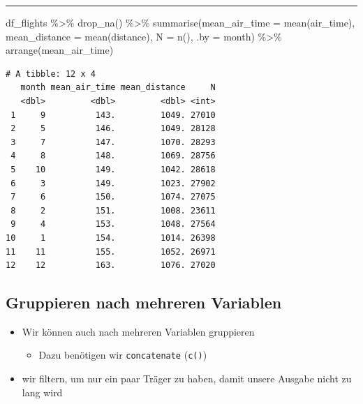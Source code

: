 \documentclass[
  letterpaper,
  DIV=11]{scrartcl}
\newenvironment{Shaded}{\begin{snugshade}}{\end{snugshade}}
\newcommand{\AttributeTok}[1]{\textcolor[rgb]{0.40,0.45,0.13}{#1}}
\newcommand{\FunctionTok}[1]{\textcolor[rgb]{0.28,0.35,0.67}{#1}}
\newcommand{\NormalTok}[1]{\textcolor[rgb]{0.00,0.23,0.31}{#1}}
\newcommand{\SpecialCharTok}[1]{\textcolor[rgb]{0.37,0.37,0.37}{#1}}
\providecommand{\tightlist}{%
  \setlength{\itemsep}{0pt}\setlength{\parskip}{0pt}}\usepackage{longtable,booktabs,array}
\begin{document}
\begin{center}\rule{0.5\linewidth}{0.5pt}\end{center}

\begin{Shaded}
\begin{Highlighting}[]
\NormalTok{df\_flights }\SpecialCharTok{\%\textgreater{}\%} 
  \FunctionTok{drop\_na}\NormalTok{() }\SpecialCharTok{\%\textgreater{}\%} 
  \FunctionTok{summarise}\NormalTok{(}\AttributeTok{mean\_air\_time =} \FunctionTok{mean}\NormalTok{(air\_time),}
            \AttributeTok{mean\_distance =} \FunctionTok{mean}\NormalTok{(distance),}
            \AttributeTok{N =} \FunctionTok{n}\NormalTok{(),}
            \AttributeTok{.by =}\NormalTok{ month) }\SpecialCharTok{\%\textgreater{}\%} 
  \FunctionTok{arrange}\NormalTok{(mean\_air\_time)}
\end{Highlighting}
\end{Shaded}

\begin{verbatim}
# A tibble: 12 x 4
   month mean_air_time mean_distance     N
   <dbl>         <dbl>         <dbl> <int>
 1     9          143.         1049. 27010
 2     5          146.         1049. 28128
 3     7          147.         1070. 28293
 4     8          148.         1069. 28756
 5    10          149.         1042. 28618
 6     3          149.         1023. 27902
 7     6          150.         1074. 27075
 8     2          151.         1008. 23611
 9     4          153.         1048. 27564
10     1          154.         1014. 26398
11    11          155.         1052. 26971
12    12          163.         1076. 27020
\end{verbatim}

\hypertarget{gruppieren-nach-mehreren-variablen}{%
\subsection{Gruppieren nach mehreren
Variablen}\label{gruppieren-nach-mehreren-variablen}}

\begin{itemize}
\tightlist
\item
  Wir können auch nach mehreren Variablen gruppieren

  \begin{itemize}
  \tightlist
  \item
    Dazu benötigen wir \texttt{concatenate} (\texttt{c()})
  \end{itemize}
\item
  wir filtern, um nur ein paar Träger zu haben, damit unsere Ausgabe
  nicht zu lang wird
\end{itemize}
\end{document}
